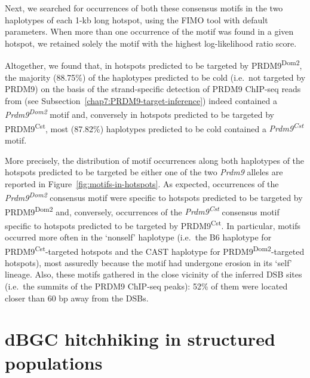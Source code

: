 Next, we searched for occurrences of both these consensus motifs in the two haplotypes of each 1-kb long hotspot, using the FIMO tool \citep{grant2011fimo} with default parameters. 
When more than one occurrence of the motif was found in a given hotspot, we retained solely the motif with the highest log-likelihood ratio score.

Altogether, we found that, in hotspots predicted to be targeted by PRDM9\textsuperscript{Dom2}, the majority (88.75\%) of the haplotypes predicted to be cold (i.e.\ not targeted by PRDM9) on the basis of the strand-specific detection of PRDM9 ChIP-seq reads from \citet{baker2015prdm9} (see Subsection~\ref{chap7:PRDM9-target-inference}) indeed contained a \textit{Prdm9\textsuperscript{Dom2}} motif and, conversely in hotspots predicted to be targeted by PRDM9\textsuperscript{Cst}, most (87.82\%) haplotypes predicted to be cold contained a \textit{Prdm9\textsuperscript{Cst}} motif.

More precisely, the distribution of motif occurrences along both haplotypes of the hotspots predicted to be targeted be either one of the two \textit{Prdm9} alleles are reported in Figure~\ref{fig:motifs-in-hotspots}.
As expected, occurrences of the \textit{Prdm9\textsuperscript{Dom2}} consensus motif were specific to hotspots predicted to be targeted by PRDM9\textsuperscript{Dom2} and, conversely, occurrences of the \textit{Prdm9\textsuperscript{Cst}} consensus motif specific to hotspots predicted to be targeted by PRDM9\textsuperscript{Cst}.
In particular, motifs occurred more often in the ‘nonself’ haplotype (i.e.\ the B6 haplotype for PRDM9\textsuperscript{Cst}-targeted hotspots and the CAST haplotype for PRDM9\textsuperscript{Dom2}-targeted hotspots), most assuredly because the motif had undergone erosion in its ‘self’ lineage.
Also, these motifs gathered in the close vicinity of the inferred DSB sites (i.e.\ the summits of the PRDM9 ChIP-seq peaks): 52\% of them were located closer than 60 bp away from the DSBs.





\section{dBGC hitchhiking in structured populations}



